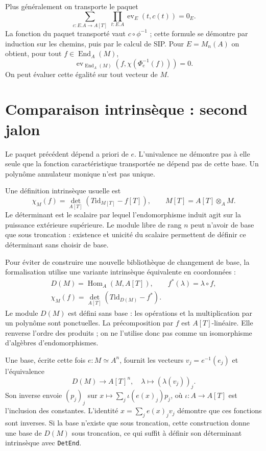 \documentclass[11pt]{article}
\newcommand{\End}{\operatorname{End}}
\newcommand{\ev}{\operatorname{ev}}
\begin{document}
Plus généralement on transporte le paquet
\[
 \sum_{c:E.A\to A[T]}\ \prod_{t:E.A}\ev_E(t,c(t))=0_E.
\]
La fonction du paquet transporté vaut $c\circ\phi^{-1}$ ; cette formule
se démontre par induction sur les chemins, puis par le calcul de SIP.
Pour $E=M_n(A)$ on obtient, pour tout $f\in\End_A(M)$,
\[
 \ev_{\End_A(M)}(f,\chi(\Phi_e^{-1}(f)))=0.
\]
On peut évaluer cette égalité sur tout vecteur de $M$.

\section{Comparaison intrinsèque : second jalon}
Le paquet précédent dépend a priori de $e$. L'univalence ne démontre
pas à elle seule que la fonction caractéristique transportée ne dépend
pas de cette base. Un polynôme annulateur monique n'est pas unique.

Une définition intrinsèque usuelle est
\[
 \chi_M(f)=\det_{A[T]}(T\mathrm{id}_{M[T]}-f[T]),
 \qquad M[T]=A[T]\otimes_A M.
\]
Le déterminant est le scalaire par lequel l'endomorphisme induit agit
sur la puissance extérieure supérieure. Le module libre de rang $n$
peut n'avoir de base que sous troncation : existence et unicité du
scalaire permettent de définir ce déterminant sans choisir de base.

Pour éviter de construire une nouvelle bibliothèque de changement de base,
la formalisation utilise une variante intrinsèque équivalente en coordonnées :
\[
 \begin{gathered}
 D(M)=\operatorname{Hom}_A(M,A[T]),\qquad f^*(\lambda)=\lambda\circ f,\\
 \chi_M(f)=\det_{A[T]}(T\mathrm{id}_{D(M)}-f^*).
 \end{gathered}
\]
Le module $D(M)$ est défini sans base : les opérations et la multiplication
par un polynôme sont ponctuelles. La précomposition par $f$ est
$A[T]$-linéaire. Elle renverse l'ordre des produits ; on ne l'utilise
donc pas comme un isomorphisme d'algèbres d'endomorphismes.

Une base, écrite cette fois $e:M\simeq A^n$, fournit les vecteurs
$v_j=e^{-1}(e_j)$ et l'équivalence
\[
 D(M)\longrightarrow A[T]^n,\quad
 \lambda\longmapsto(\lambda(v_j))_j.
\]
Son inverse envoie $(p_j)_j$ sur
$x\mapsto\sum_j\iota(e(x)_j)p_j$, où $\iota:A\to A[T]$ est l'inclusion
des constantes. L'identité $x=\sum_je(x)_jv_j$ démontre que ces fonctions
sont inverses. Si la base n'existe que sous troncation, cette construction
donne une base de $D(M)$ sous troncation, ce qui suffit à définir son
déterminant intrinsèque avec \texttt{DetEnd}.
\end{document}
